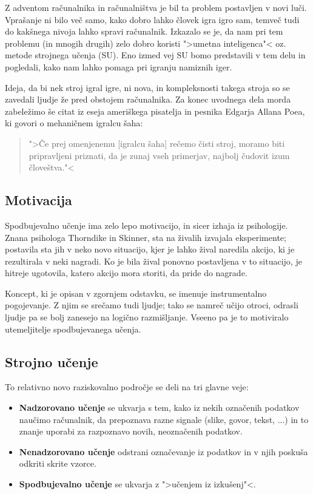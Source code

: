 \documentclass[12pt,a4paper]{amsart}
\theoremstyle{definition} %
\theoremstyle{plain} %
\begin{document}
Z adventom računalnika in računalništva je bil ta problem postavljen v novi luči. Vprašanje
ni bilo več samo, kako dobro lahko človek igra igro sam, temveč tudi do kakšnega nivoja 
lahko spravi računalnik. Izkazalo se je, da nam pri tem problemu (in mnogih drugih) zelo dobro
koristi ">umetna inteligenca"< oz. metode strojnega učenja (SU). Eno izmed vej SU bomo 
predstavili v tem delu in pogledali, kako nam lahko pomaga pri igranju namiznih iger.

Ideja, da bi nek stroj igral igre, ni nova, in kompleksnosti takega stroja so se zavedali ljudje
že pred obstojem računalnika. 
Za konec uvodnega dela morda zabeležimo še citat iz eseja ameriškega pisatelja in pesnika 
Edgarja Allana Poea, ki govori o mehaničnem igralcu šaha: 

\begin{quotation}
    ">Če prej omenjenemu [igralcu šaha] rečemo čisti stroj, moramo biti pripravljeni priznati, da je
    zunaj vseh primerjav, najbolj čudovit izum človeštva."<
\end{quotation}

\subsection{Motivacija}
Spodbujevalno učenje ima zelo lepo motivacijo, in sicer izhaja iz psihologije. Znana psihologa 
Thorndike in Skinner, sta na živalih izvajala eksperimente; postavila sta jih v neko novo 
situacijo, kjer je lahko žival naredila akcijo, ki je rezultirala v neki nagradi. Ko je bila
žival ponovno postavljena v to situacijo, je hitreje ugotovila, katero akcijo mora storiti, da
pride do nagrade.

Koncept, ki je opisan v zgornjem odstavku, se imenuje instrumentalno pogojevanje. Z njim se 
srečamo tudi ljudje; tako se namreč učijo otroci, odrasli ljudje pa se bolj zanesejo na 
logično razmišljanje. Vseeno pa je to motiviralo utemeljitelje spodbujevanega učenja.

\subsection{Strojno učenje}
To relativno novo raziskovalno področje se deli na tri glavne veje:
\begin{itemize}
    \item \textbf{Nadzorovano učenje} se ukvarja s tem, kako iz nekih označenih podatkov 
            naučimo računalnik, da prepoznava razne signale (slike, govor, tekst, ...)
            in to znanje uporabi za razpoznavo novih, neoznačenih podatkov.
    \item \textbf{Nenadzorovano učenje} odstrani označevanje iz podatkov in v njih poskuša 
            odkriti skrite vzorce.
    \item \textbf{Spodbujevalno učenje} se ukvarja z ">učenjem iz izkušenj"<.
\end{itemize}
\end{document}
